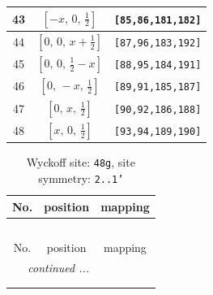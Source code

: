 \documentclass[fleqn,8pt]{jsarticle}
\begin{document}
\begin{longtable}{ccc}
43 & $\left[ - x,\, 0,\, \frac{1}{2} \right]$ & {\tt [85,86,181,182]} \\ \hline
44 & $\left[ 0,\, 0,\, x + \frac{1}{2} \right]$ & {\tt [87,96,183,192]} \\ \hline
45 & $\left[ 0,\, 0,\, \frac{1}{2} - x \right]$ & {\tt [88,95,184,191]} \\ \hline
46 & $\left[ 0,\, - x,\, \frac{1}{2} \right]$ & {\tt [89,91,185,187]} \\ \hline
47 & $\left[ 0,\, x,\, \frac{1}{2} \right]$ & {\tt [90,92,186,188]} \\ \hline
48 & $\left[ x,\, 0,\, \frac{1}{2} \right]$ & {\tt [93,94,189,190]} \\
\end{longtable}
\renewcommand{\arraystretch}{1.2}
\begin{longtable}{ccc}
\caption{Wyckoff site: {\tt 48g}, site symmetry: {\tt 2..1'}}
 \\
 \hline \hline
No. & position & mapping \\ \hline \endfirsthead

\multicolumn{2}{l}{\tablename\ \thetable{}} \\
 \hline \hline
No. & position & mapping \\ \hline \endhead

 \hline \hline
\multicolumn{2}{r}{\footnotesize\it continued ...} \\ \endfoot

 \hline \hline
\multicolumn{2}{r}{} \\ \endlastfoot


\end{longtable}
\end{document}
